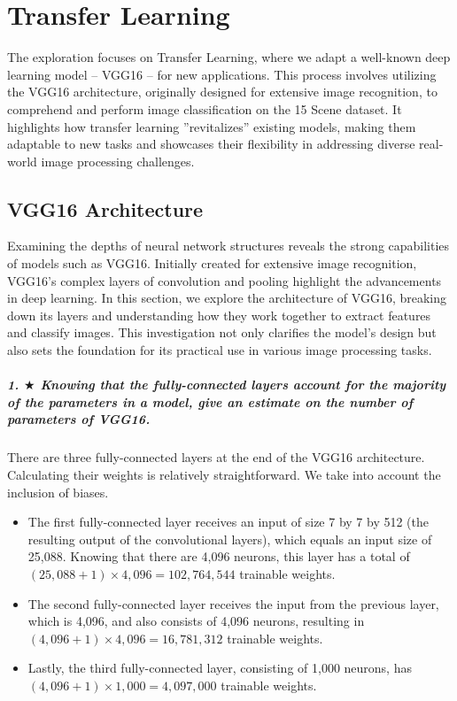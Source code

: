 \chapter{Transfer Learning}
\graphicspath{{figs/2a/}}

The exploration focuses on Transfer Learning, where we adapt a well-known deep learning model -- VGG16 -- for new applications. This process involves utilizing the VGG16 architecture, originally designed for extensive image recognition, to comprehend and perform image classification on the 15 Scene dataset. It highlights how transfer learning ''revitalizes'' existing models, making them adaptable to new tasks and showcases their flexibility in addressing diverse real-world image processing challenges.

\section{VGG16 Architecture}

Examining the depths of neural network structures reveals the strong capabilities of models such as VGG16. Initially created for extensive image recognition, VGG16's complex layers of convolution and pooling highlight the advancements in deep learning. In this section, we explore the architecture of VGG16, breaking down its layers and understanding how they work together to extract features and classify images. This investigation not only clarifies the model's design but also sets the foundation for its practical use in various image processing tasks.

\paragraph{1. $\bigstar$ Knowing that the fully-connected layers account for the majority of the parameters in a model, give an estimate on the number of parameters of VGG16.}

There are three fully-connected layers at the end of the VGG16 architecture. Calculating their weights is relatively straightforward. We take into account the inclusion of biases.

\begin{itemize}
    \item The first fully-connected layer receives an input of size 7 by 7 by 512 (the resulting output of the convolutional layers), which equals an input size of 25,088. Knowing that there are 4,096 neurons, this layer has a total of $(25,088 + 1) \times 4,096 = 102,764,544$ trainable weights.
    \item The second fully-connected layer receives the input from the previous layer, which is 4,096, and also consists of 4,096 neurons, resulting in $(4,096 + 1) \times 4,096 = 16,781,312$ trainable weights.
    \item Lastly, the third fully-connected layer, consisting of 1,000 neurons, has $(4,096 + 1) \times 1,000 = 4,097,000$ trainable weights.
\end{itemize}

